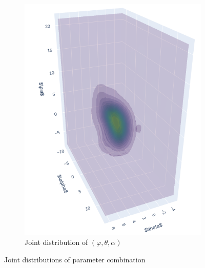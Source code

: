 \documentclass[a4paper,12pt]{article}
\theoremstyle{definition}
\begin{document}
\begin{figure}[htbp]
\begin{subfigure}[b]{0.3\textwidth}
        \includegraphics[width=\textwidth]{VariableSelectionPsi/joint3d_theta_alpha_psi.png}
        \caption{Joint distribution of \((\varphi, \theta, \alpha)\)}
        \label{fig:joint3D_theta_alpha_psi}
    \end{subfigure}

    \caption{Joint distributions of parameter combination}
    \label{fig:joint_distributions_psi}

\end{figure}
\newpage
\printbibliography
\end{document}
